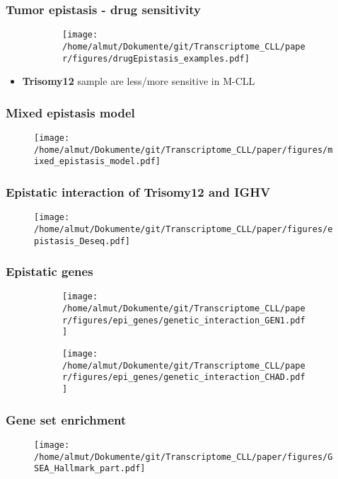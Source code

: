 \documentclass[xcolor=dvipsnames,t,10pt]{beamer}
\begin{document}
%
\begin{frame}[c]
	\frametitle{Tumor epistasis - drug sensitivity}
	\begin{figure}
		\centering
		\begin{subfigure}[t]{\columnwidth}
			\texttt{[image: /home/almut/Dokumente/git/Transcriptome\_CLL/paper/figures/drugEpistasis\_examples.pdf]}
		\end{subfigure}
		\hfill
	\end{figure}
	\begin{itemize}
		\item \textbf{Trisomy12} sample are less/more sensitive in M-CLL
	\end{itemize}
\end{frame}
%
%
\begin{frame}[c]
	\frametitle{Mixed epistasis model}
	\begin{figure}
		\centering
		\texttt{[image: /home/almut/Dokumente/git/Transcriptome\_CLL/paper/figures/mixed\_epistasis\_model.pdf]}
	\end{figure}
\end{frame}
%
\begin{frame}[c]
	\frametitle{Epistatic interaction of Trisomy12 and IGHV}
	\begin{figure}
		\centering
		\texttt{[image: /home/almut/Dokumente/git/Transcriptome\_CLL/paper/figures/epistasis\_Deseq.pdf]}
	\end{figure}
\end{frame}
%
%
%
\begin{frame}[c]
	\frametitle{Epistatic genes}
	\begin{figure}
		\centering
		\begin{subfigure}[t]{0.45\columnwidth}
			\texttt{[image: /home/almut/Dokumente/git/Transcriptome\_CLL/paper/figures/epi\_genes/genetic\_interaction\_GEN1.pdf]}
		\end{subfigure}
		\hfill
		\begin{subfigure}[t]{0.45\columnwidth}
			\texttt{[image: /home/almut/Dokumente/git/Transcriptome\_CLL/paper/figures/epi\_genes/genetic\_interaction\_CHAD.pdf]}
		\end{subfigure}
	\end{figure}
\end{frame}
% 
%
%
\begin{frame}[c]
	\frametitle{Gene set enrichment}
	\begin{figure}
		\centering
		\texttt{[image: /home/almut/Dokumente/git/Transcriptome\_CLL/paper/figures/GSEA\_Hallmark\_part.pdf]}
	\end{figure}
\end{frame}
%
\end{document}
